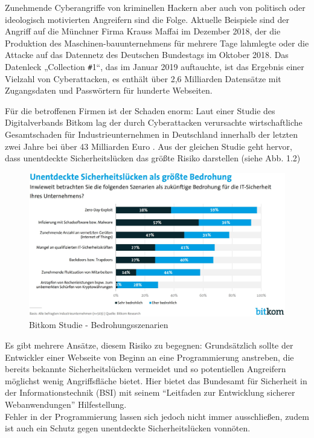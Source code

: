 \documentclass[12pt,oneside,a4paper,parskip,pointlessnumbers]{scrbook}
\begin{document}
Zunehmende Cyberangriffe von kriminellen Hackern aber auch von politisch oder ideologisch motivierten Angreifern sind die Folge. Aktuelle Beispiele sind der Angriff auf die Münchner Firma Krauss Maffai im Dezember 2018, der die Produktion des Maschinen-bauunternehmens für mehrere Tage lahmlegte oder die Attacke auf das Datennetz des Deutschen Bundestags im Oktober 2018. Das Datenleck „Collection \texttt{\#}1“, das im Januar 2019 auftauchte, ist das Ergebnis einer Vielzahl von Cyberattacken, es enthält über 2,6 Milliarden Datensätze mit Zugangsdaten und Passwörtern für hunderte Webseiten.

Für die betroffenen Firmen ist der Schaden enorm: Laut einer Studie des Digitalverbands Bitkom lag der durch Cyberattacken verursachte wirtschaftliche Gesamtschaden für Industrieunternehmen in Deutschland innerhalb der letzten zwei Jahre bei über 43 Milliarden Euro \cite{Bitkom}. Aus der gleichen Studie geht hervor, dass unentdeckte Sicherheitslücken das größte Risiko darstellen (siehe Abb. 1.2)\\

\begin{figure}[htb!]
  \centering
   \includegraphics[width=1\textwidth]{Images/Bitkom}
  \caption[Bitkom Studie - Bedrohungsszenarien]{Bitkom Studie - Bedrohungsszenarien \cite{Bitkom}}
\end{figure}
Es gibt mehrere Ansätze, diesem Risiko zu begegnen: Grundsätzlich sollte der Entwickler einer Webseite von Beginn an eine Programmierung anstreben, die bereits bekannte Sicherheitslücken vermeidet und so potentiellen Angreifern möglichst wenig Angriffsfläche bietet. Hier bietet das Bundesamt für Sicherheit in der Informationstechnik (BSI) mit seinem ``Leitfaden zur Entwicklung sicherer Webanwendungen''  \cite{BSI} Hilfestellung.\\
Fehler in der Programmierung lassen sich jedoch nicht immer ausschließen, zudem ist auch ein Schutz gegen unentdeckte Sicherheitslücken vonnöten.
\end{document}
